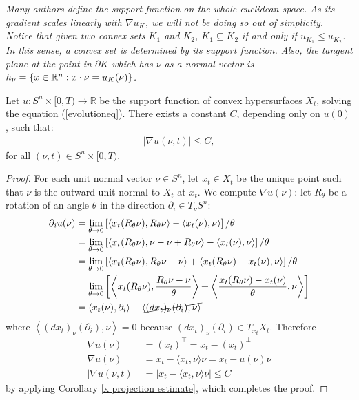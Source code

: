 \begin{oss}
	\em Many authors define the support function on the whole euclidean space. As its gradient scales linearly with $\nabla u_K$, we will not be doing so out of simplicity. Notice that given two convex sets $K_1$ and $K_2$, $K_1 \subseteq K_2$ if and only if   $u_{K_1} \leq u_{K_2}$. In this sense, a convex set is determined by its support function. Also, the tangent plane at the point in $\partial K$ which has $\nu$ as a normal vector is  $h_\nu=\{x\in \mathbb{R}^n : x \cdot \nu = u_K (\nu)\}$. 
\end{oss}

\begin{cor}
	Let $ u : S^n \times [0, T) \to \mathbb{R} $ be the support function of convex hypersurfaces $ X_t $, solving the equation  (\ref{evolutioneq}). There exists a constant $ C $, depending only on $ u(0) $, such that:
	\begin{align*}
		|\nabla u(\nu, t)| \leq C,
	\end{align*}
	for all $ (\nu, t) \in S^n \times [0, T)$.
\end{cor}


\begin{proof} 
	For each unit normal vector $ \nu \in S^n $, let $ x_t \in X_t $ be the unique point such that $ \nu $ is the outward unit normal to $ X_t $ at $ x_t $. We compute $\nabla u(\nu)$: let $R_\theta$ be a rotation of an angle $\theta$ in the direction $\partial_i\in T_\nu S^n$:	
	\begin{align*}
		\partial_i u(\nu)  &= \lim_{\theta \rightarrow 0} \left[\langle x_t(R_\theta \nu) , R_\theta \nu\rangle - \langle x_t(\nu) ,  \nu\rangle\right]/\theta\\
		 &= \lim_{\theta \rightarrow 0} \left[\langle x_t(R_\theta \nu) , \nu - \nu + R_\theta \nu\rangle - \langle x_t(\nu) ,  \nu\rangle\right]/\theta\\
		 &= \lim_{\theta \rightarrow 0} \left[\langle x_t(R_\theta \nu) ,  R_\theta \nu - \nu\rangle + \langle  x_t(R_\theta \nu)  - x_t(\nu) ,  \nu\rangle\right]/\theta\\ 
		 &= \lim_{\theta \rightarrow 0}\left[ \left\langle x_t(R_\theta \nu) , \frac{ R_\theta \nu - \nu}{\theta}\right\rangle + \left\langle  \frac{x_t(R_\theta \nu)  - x_t(\nu)}{\theta} ,  \nu\right\rangle\right]\\
		 &= \left\langle x_t(\nu) , \partial_i\right\rangle + \cancel{\left\langle  (dx_t)_{\nu}(\partial_i),  \nu\right\rangle}
	\end{align*}
	where $\left\langle  (dx_t)_{\nu}(\partial_i),  \nu\right\rangle=0$ because $ (dx_t)_{\nu}(\partial_i) \in T_{x_t}X_t$. Therefore
	\begin{align*}
		\nabla u(\nu) &= (x_t)^\top =x_t - (x_t)^\bot \\
		\nabla u(\nu) &= x_t - \langle x_t , \nu\rangle \nu= x_t - u(\nu) \nu\\
		|\nabla u(\nu, t)| &= | x_t - \langle x_t , \nu\rangle \nu |\leq C 
	\end{align*}
	by applying Corollary \ref{x projection estimate},  which completes the proof.
\end{proof}


